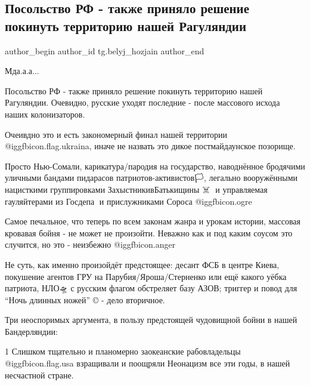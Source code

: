  
 
 
 
 
 
\subsection{Посольство РФ - также приняло решение покинуть территорию нашей Рагуляндии}
\label{sec:12_02_2022.tg.belyj_hozjain.1.posolstvo_rf_raguljandia}
 
\ifcmt
 author_begin
   author_id tg.belyj_hozjain
 author_end
\fi

Мда.а.а...

Посольство РФ - также приняло решение покинуть территорию нашей Рагуляндии.
Очевидно, русские уходят последние - после массового исхода наших
колонизаторов.

Очеивдно это и есть закономерный финал нашей территории
@igg{fbicon.flag.ukraina}, иначе не назвать это дикое постмайдаунское позорище.

Просто Нью-Сомали, карикатура/пародия на государство, наводнённое бродячими
уличными бандами пидарасов патриотов-активистов🏳, легально вооружёнными
нацисткими группировками ЗахыстникивБатькищины ☠ ️  и управляемая гауляйтерами
из Госдепа🗽 и прислужниками Сороса @igg{fbicon.ogre} 

Самое печальное, что теперь по всем законам жанра и урокам истории, массовая
кровавая бойня - не может не произойти.  Неважно как и под каким соусом это
случится, но это - неизбежно @igg{fbicon.anger} 

Не суть, как именно произойдёт предстоящее: десант ФСБ в центре Киева,
покушение агентов ГРУ на Парубия/Яроша/Стерненко или ещё какого уёбка патриота,
НЛО🛸 с русским флагом обстреляет базу АЗОВ; триггер и повод для \enquote{Ночь длинных
ножей} © - дело вторичное.

Три неоспоримых аргумента, в пользу предстоящей чудовищной бойни в нашей
Бандерляндии:

1 Слишком тщательно и планомерно заокеанские рабовладельцы
@igg{fbicon.flag.usa} взращивали и поощряли Неонацизм все эти годы, в нашей
несчастной стране.

